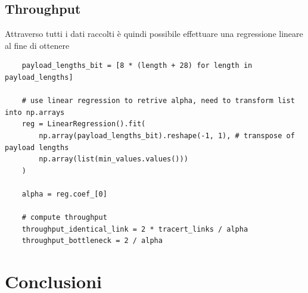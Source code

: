 \vspace{15px}\subsection{Throughput}\label{throughput}

Attraverso tutti i dati raccolti è quindi possibile effettuare una regressione lineare al fine di ottenere 

\begin{lstlisting}
    payload_lengths_bit = [8 * (length + 28) for length in payload_lengths]

    # use linear regression to retrive alpha, need to transform list into np.arrays
    reg = LinearRegression().fit(
        np.array(payload_lengths_bit).reshape(-1, 1), # transpose of payload lengths
        np.array(list(min_values.values())) 
    )

    alpha = reg.coef_[0]

    # compute throughput
    throughput_identical_link = 2 * tracert_links / alpha
    throughput_bottleneck = 2 / alpha
\end{lstlisting}





\vspace{35px}\section{Conclusioni}




